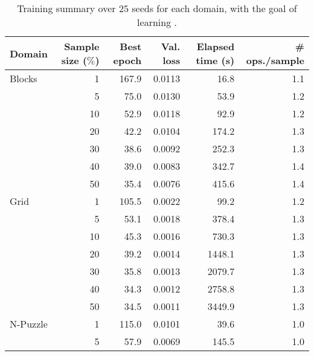 \begin{table}[!h]
\centering
\caption{Training summary over $25$ seeds for each domain, with the goal of learning \pog.} 
\label{tab:training_info}
\vspace{\baselineskip}
\begin{tabular}{lrrrrr}
\toprule
Domain   & Sample size ($\%$) &  Best epoch &  Val. loss &  Elapsed time (s) &  \# ops./sample \\
\midrule
Blocks   & 1 &       167.9 &      0.0113 &                16.8 &                           1.1 \\
         & 5 &        75.0 &      0.0130 &                53.9 &                           1.2 \\
         & 10 &        52.9 &      0.0118 &                92.9 &                           1.2 \\
         & 20 &        42.2 &      0.0104 &               174.2 &                           1.3 \\
         & 30 &        38.6 &      0.0092 &               252.3 &                           1.3 \\
         & 40 &        39.0 &      0.0083 &               342.7 &                           1.4 \\
         & 50 &        35.4 &      0.0076 &               415.6 &                           1.4 \\ \midrule
Grid     & 1 &       105.5 &      0.0022 &                99.2 &                           1.2 \\
         & 5 &        53.1 &      0.0018 &               378.4 &                           1.3 \\
         & 10 &        45.3 &      0.0016 &               730.3 &                           1.3 \\
         & 20 &        39.2 &      0.0014 &              1448.1 &                           1.3 \\
         & 30 &        35.8 &      0.0013 &              2079.7 &                           1.3 \\
         & 40 &        34.3 &      0.0012 &              2758.8 &                           1.3 \\
         & 50 &        34.5 &      0.0011 &              3449.9 &                           1.3 \\ \midrule
N-Puzzle & 1 &       115.0 &      0.0101 &                39.6 &                           1.0 \\
         & 5 &        57.9 &      0.0069 &               145.5 &                           1.0 \\

\end{tabular}
\end{table}
